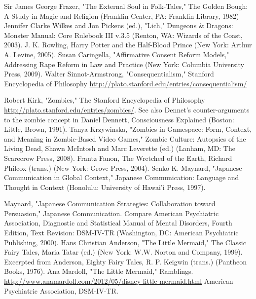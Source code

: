 \begin{thebibliography}{200}
    Sir James George Frazer, "The External Soul in Folk-Tales," The Golden Bough: A Study in Magic and Religion (Franklin Center, PA: Franklin Library, 1982)
    Jennifer Clarke Wilkes and Jon Pickens (ed.), "Lich," Dungeons \& Dragons: Monster Manual: Core Rulebook III v.3.5 (Renton, WA: Wizards of the Coast, 2003).
    J. K. Rowling, Harry Potter and the Half-Blood Prince (New York: Arthur A. Levine, 2005).
    Susan Caringella, "Affirmative Consent Reform Models," Addressing Rape Reform in Law and Practice (New York: Columbia University Press, 2009).
    Walter Sinnot-Armstrong, "Consequentialism," Stanford Encyclopedia of Philosophy \url{http://plato.stanford.edu/entries/consequentialism/}

    Robert Kirk, "Zombies," The Stanford Encyclopedia of Philosophy \url{http://plato.stanford.edu/entries/zombies/}. See also Dennet's counter-arguments to the zombie concept in Daniel Dennett, Consciousness Explained (Boston: Little, Brown, 1991).
    Tanya Krzywinska, "Zombies in Gamespace: Form, Context, and Meaning in Zombie-Based Video Games," Zombie Culture: Autopsies of the Living Dead, Shawn McIntosh and Marc Leverette (ed.) (Lanham, MD: The Scarecrow Press, 2008).
    Frantz Fanon, The Wretched of the Earth, Richard Philcox (trans.) (New York: Grove Press, 2004).
    Senko K. Maynard, "Japanese Communication in Global Context," Japanese Communication: Language and Thought in Context (Honolulu: University of Hawai'i Press, 1997).

    Maynard, "Japanese Communication Strategies: Collaboration toward Persuasion," Japanese Communication.
    Compare American Psychiatric Association, Diagnostic and Statistical Manual of Mental Disorders, Fourth Edition, Text Revision: DSM-IV-TR (Washington, DC: American Psychiatric Publishing, 2000).
    Hans Christian Anderson, "The Little Mermaid," The Classic Fairy Tales, Maria Tatar (ed.) (New York: W.W. Norton and Company, 1999). Excerpted from Anderson, Eighty Fairy Tales, R. P. Keigwin (trans.) (Pantheon Books, 1976).
    Ana Mardoll, "The Little Mermaid," Ramblings. \url{http://www.anamardoll.com/2012/05/disney-little-mermaid.html}
    American Psychiatric Association, DSM-IV-TR.
    

\end{thebibliography}
